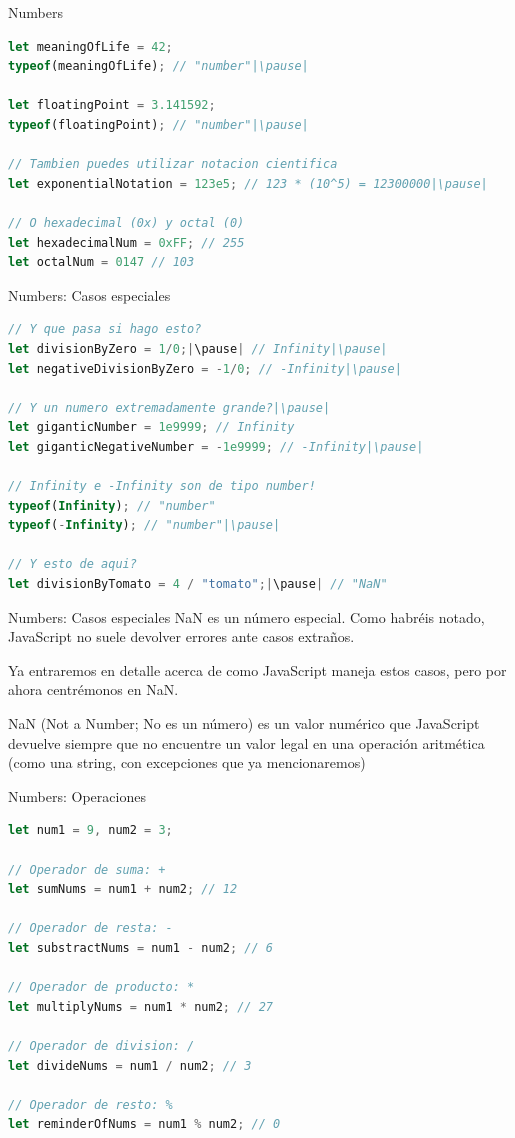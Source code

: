 \documentclass{beamer}
\begin{document}
\begin{frame}[fragile]{Numbers}
\begin{lstlisting}[language=JavaScript]
let meaningOfLife = 42;
typeof(meaningOfLife); // "number"|\pause|

let floatingPoint = 3.141592;
typeof(floatingPoint); // "number"|\pause|

// Tambien puedes utilizar notacion cientifica
let exponentialNotation = 123e5; // 123 * (10^5) = 12300000|\pause|

// O hexadecimal (0x) y octal (0)
let hexadecimalNum = 0xFF; // 255
let octalNum = 0147 // 103
\end{lstlisting}    
\end{frame}

\begin{frame}[fragile]{Numbers: Casos especiales}
\begin{lstlisting}[language=JavaScript]
// Y que pasa si hago esto?
let divisionByZero = 1/0;|\pause| // Infinity|\pause|
let negativeDivisionByZero = -1/0; // -Infinity|\pause|

// Y un numero extremadamente grande?|\pause|
let giganticNumber = 1e9999; // Infinity
let giganticNegativeNumber = -1e9999; // -Infinity|\pause|

// Infinity e -Infinity son de tipo number!
typeof(Infinity); // "number"
typeof(-Infinity); // "number"|\pause|

// Y esto de aqui?
let divisionByTomato = 4 / "tomato";|\pause| // "NaN"
\end{lstlisting}    
\end{frame}

\begin{frame}{Numbers: Casos especiales}
NaN es un número especial. Como habréis notado, JavaScript no suele devolver errores ante casos extraños.

Ya entraremos en detalle acerca de como JavaScript maneja estos casos, pero por ahora centrémonos en NaN.\pause

NaN (Not a Number; No es un número) es un valor numérico que JavaScript devuelve siempre que no encuentre un valor legal en una operación aritmética (como una string, con excepciones que ya mencionaremos)
\end{frame}

\begin{frame}[fragile]{Numbers: Operaciones}
\begin{lstlisting}[language=JavaScript]
let num1 = 9, num2 = 3;

// Operador de suma: +
let sumNums = num1 + num2; // 12

// Operador de resta: -
let substractNums = num1 - num2; // 6

// Operador de producto: *
let multiplyNums = num1 * num2; // 27

// Operador de division: /
let divideNums = num1 / num2; // 3

// Operador de resto: %
let reminderOfNums = num1 % num2; // 0
\end{lstlisting}
\end{frame}
\end{document}
